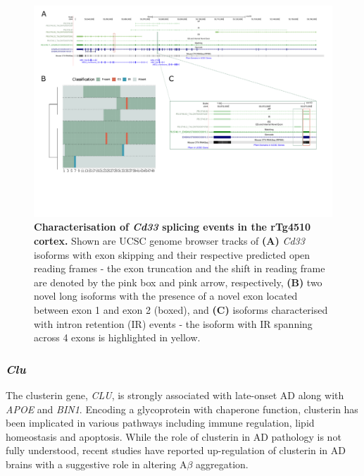 \begin{landscape}
	\begin{figure}[htp]
		\centering
		\captionsetup{width=1.3\textwidth}
		\includegraphics[page=5,trim={0 3.5cm 0 0},scale = 0.85]{Figures/TargetGenes_Annotation_Landscape.pdf}
		\caption[Characterisation of the \textit{Cd33} splicing landscape]%
		{\textbf{Characterisation of \textit{Cd33} splicing events in the rTg4510 cortex.} Shown are UCSC genome browser tracks of \textbf{(A)} \textit{Cd33} isoforms with exon skipping and their respective predicted open reading frames - the exon truncation and the shift in reading frame are denoted by the pink box and pink arrow, respectively, \textbf{(B)} two novel long isoforms with the presence of a novel exon located between exon 1 and exon 2 (boxed), and \textbf{(C)} isoforms characterised with intron retention (IR) events - the isoform with IR spanning across 4 exons is highlighted in yellow.}    
		\label{fig:cd33_orf}
	\end{figure}
\end{landscape}
\restoregeometry 

\newpage
\subsubsection{\textit{Clu}}
The clusterin gene, \textit{CLU}, is strongly associated with late-onset AD along with \textit{APOE} and \textit{BIN1}\cite{Lambert2013}. Encoding a glycoprotein with chaperone function, clusterin has been implicated in various pathways including immune regulation, lipid homeostasis and apoptosis\cite{Foster2019}. While the role of clusterin in AD pathology is not fully understood, recent studies have reported up-regulation of clusterin in AD brains with a suggestive role in altering A$\beta$ aggregation\cite{Jackson2019}. 

